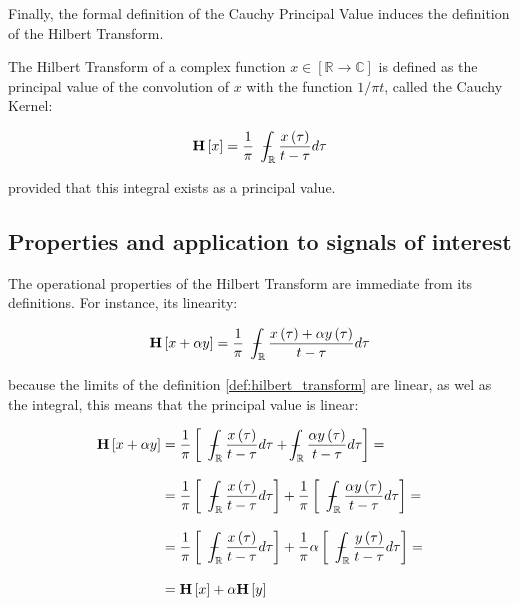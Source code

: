 	Finally, the formal definition of the Cauchy Principal Value induces the definition of the Hilbert Transform.

\begin{definition} \label{def:hilbert_transform} %

	The Hilbert Transform of a complex function $x\in\left[\mathbb{R}\to\mathbb{C}\right]$ is defined as the principal value of the convolution of $x$ with the function $1/\pi t$, called the Cauchy Kernel:

\begin{equation} \mathbf{H}\left[x\right] = \dfrac{1}{\pi}\hspace{2mm} \dashint_{\mathbb{R}} \dfrac{x\left(\tau\right)}{t - \tau} d\tau \end{equation}

	\noindent provided that this integral exists as a principal value.

\end{definition} 

\subsection{Properties and application to signals of interest} %

	The operational properties of the Hilbert Transform are immediate from its definitions. For instance, its linearity: 

\begin{equation} \mathbf{H}\left[x + \alpha y\right] = \dfrac{1}{\pi}\hspace{2mm} \dashint_{\mathbb{R}} \dfrac{x\left(\tau\right) + \alpha y\left(\tau\right)}{t - \tau} d\tau \end{equation}

	\noindent because the limits of the definition \ref{def:hilbert_transform} are linear, as wel as the integral, this means that the principal value is linear:

\begin{align}
	\mathbf{H}\left[x + \alpha y\right] &= \dfrac{1}{\pi} \left[\hspace{2mm}\dashint_{\mathbb{R}} \dfrac{x\left(\tau\right)}{t - \tau} d\tau + \dashint_{\mathbb{R}} \dfrac{\alpha y\left(\tau\right)}{t - \tau} d\tau\right] = \nonumber\\[3mm]
	&= \dfrac{1}{\pi} \left[\hspace{2mm}\dashint_{\mathbb{R}} \dfrac{x\left(\tau\right)}{t - \tau} d\tau\right]  + \dfrac{1}{\pi}\left[\hspace{2mm}\dashint_{\mathbb{R}} \dfrac{\alpha y\left(\tau\right)}{t - \tau} d\tau\right] = \nonumber\\[3mm]
	&= \dfrac{1}{\pi} \left[\hspace{2mm}\dashint_{\mathbb{R}} \dfrac{x\left(\tau\right)}{t - \tau} d\tau\right]  + \dfrac{1}{\pi}\alpha\left[\hspace{2mm}\dashint_{\mathbb{R}} \dfrac{y\left(\tau\right)}{t - \tau} d\tau\right] = \nonumber\\[3mm]
	&= \mathbf{H}\left[x\right] + \alpha\mathbf{H}\left[y\right]
\end{align}

